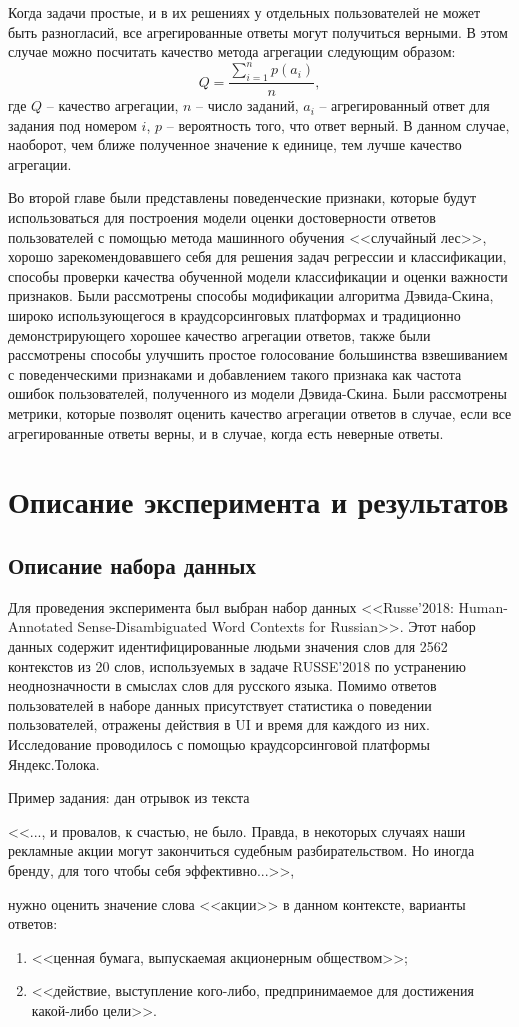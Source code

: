 \documentclass[specification,annotation,times]{itmo-student-thesis}
\begin{document}
Когда задачи простые, и в их решениях у отдельных пользователей не может быть разногласий, все агрегированные ответы могут получиться верными. В этом случае можно посчитать качество метода агрегации следующим образом:
\[Q=\frac{\sum_{i=1}^{n}p(a_{i})}{n},\]
где $Q$ -- качество агрегации, $n$ -- число заданий, $a_{i}$ -- агрегированный ответ для задания под номером $i$, $p$ -- вероятность того, что ответ верный. В данном случае, наоборот, чем ближе полученное значение к единице, тем лучше качество агрегации.

\chapterconclusion
Во второй главе были представлены поведенческие признаки, которые будут использоваться для построения модели оценки достоверности ответов пользователей с помощью метода машинного обучения <<случайный лес>>, хорошо зарекомендовавшего себя для решения задач регрессии и классификации, способы проверки качества обученной модели классификации и оценки важности признаков. Были рассмотрены способы модификации алгоритма Дэвида-Скина, широко использующегося в краудсорсинговых платформах и традиционно демонстрирующего хорошее качество агрегации ответов, также были рассмотрены способы улучшить простое голосование большинства взвешиванием с поведенческими признаками и добавлением такого признака как частота ошибок пользователей, полученного из модели Дэвида-Скина. Были рассмотрены метрики, которые позволят оценить качество агрегации ответов в случае, если все агрегированные ответы верны, и в случае, когда есть неверные ответы.

\chapter{Описание эксперимента и результатов}
\section{Описание набора данных}
Для проведения эксперимента был выбран набор данных <<Russe'2018: Human-Annotated Sense-Disambiguated Word Contexts for Russian>>. Этот набор данных содержит идентифицированные людьми значения слов для 2562 контекстов из 20 слов, используемых в задаче RUSSE'2018 по устранению неоднозначности в смыслах слов для русского языка. Помимо ответов пользователей в наборе данных присутствует статистика о поведении пользователей, отражены действия в UI и время для каждого из них. Исследование проводилось с помощью краудсорсинговой платформы Яндекс.Толока.

Пример задания: дан отрывок из текста \begin{displayquote}<<..., и провалов, к счастью, не было. Правда, в некоторых случаях наши рекламные акции могут закончиться судебным разбирательством. Но иногда бренду, для того чтобы себя эффективно...>>,\end{displayquote} нужно оценить значение слова <<акции>> в данном контексте, варианты ответов:
\begin{enumerate}
    \item <<ценная бумага, выпускаемая акционерным обществом>>;
    \item <<действие, выступление кого-либо, предпринимаемое для достижения какой-либо цели>>.
\end{enumerate}
\end{document}
